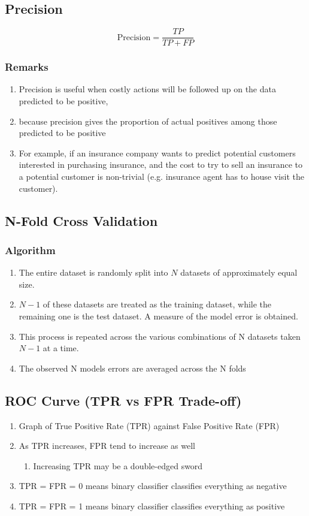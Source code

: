 \documentclass[../../dsa1101_notes.Rtex]{subfiles}\usepackage[]{graphicx}\usepackage[]{color}
\begin{document}
\subsection{Precision}
\[\text{Precision} = \frac{TP}{TP + FP}\]

\subsubsection{Remarks}
\begin{enumerate}
  \item Precision is useful when costly actions will be followed up on the data predicted to be positive,
  \item because precision gives the proportion of actual positives among those predicted to be positive
  \item For example, if an insurance company wants to predict potential customers interested in purchasing insurance, and the cost to try to sell an insurance to a potential customer is non-trivial (e.g. insurance agent has to house visit the customer).
\end{enumerate}

\subsection{N-Fold Cross Validation}
\subsubsection{Algorithm}
\begin{enumerate}
	\item The entire dataset is randomly split into \(N\) datasets of approximately equal size.
	\item \(N-1\) of these datasets are treated as the training dataset, while the remaining one is the test dataset. A measure of the model error is obtained.
	\item This process is repeated across the various combinations of N datasets taken \(N-1\) at a time.
	\item The observed N models errors are averaged across the N folds
\end{enumerate}

\subsection{ROC Curve (TPR vs FPR Trade-off)}
\begin{enumerate}
    \item Graph of True Positive Rate (TPR) against False Positive Rate (FPR)
    \item As TPR increases, FPR tend to increase as well
        \begin{enumerate}
            \item Increasing TPR may be a double-edged sword
        \end{enumerate}
    \item TPR = FPR = 0 means binary classifier classifies everything as negative
    \item TPR = FPR = 1 means binary classifier classifies everything as positive
\end{enumerate}
\end{document}
